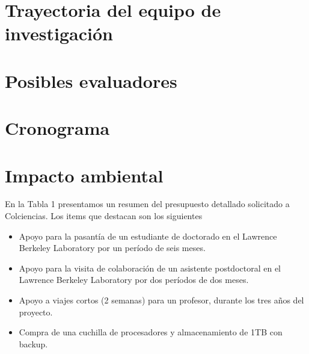 \documentclass[12pt]{article}
\begin{document}


\section{Trayectoria del equipo de investigaci\'on}


\section{Posibles evaluadores}

\section{Cronograma}

\section{Impacto ambiental}


En la Tabla 1 presentamos un resumen del presupuesto detallado
solicitado a Colciencias. Los items que destacan son los siguientes

\begin{itemize}

\item Apoyo para la pasant\'ia de un estudiante de doctorado en el
  Lawrence Berkeley Laboratory por un per\'iodo de seis meses.
\item Apoyo para la visita de colaboraci\'on de un asistente postdoctoral en el
  Lawrence Berkeley Laboratory por dos per\'iodos de dos meses.
\item Apoyo a viajes cortos (2 semanas) para un profesor, durante los
  tres a\~nos del proyecto. 
\item Compra de una cuchilla de procesadores y almacenamiento de 1TB
  con backup.
\end{itemize}
\end{document}
